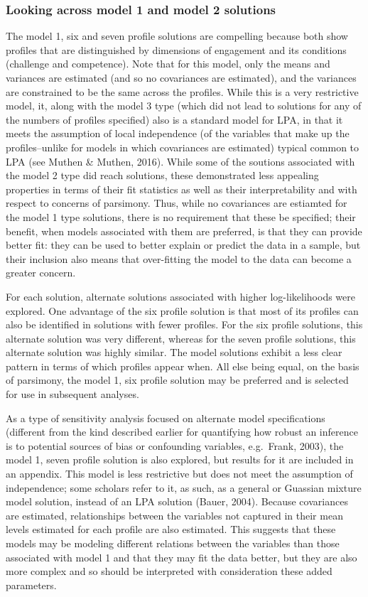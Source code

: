 \documentclass[]{msu-thesis}
\theoremstyle{definition}
\theoremstyle{definition}
\theoremstyle{definition}
\theoremstyle{remark}
\begin{document}
\subsubsection{Looking across model 1 and model 2
solutions}\label{looking-across-model-1-and-model-2-solutions}

The model 1, six and seven profile solutions are compelling because both
show profiles that are distinguished by dimensions of engagement and its
conditions (challenge and competence). Note that for this model, only
the means and variances are estimated (and so no covariances are
estimated), and the variances are constrained to be the same across the
profiles. While this is a very restrictive model, it, along with the
model 3 type (which did not lead to solutions for any of the numbers of
profiles specified) also is a standard model for LPA, in that it meets
the assumption of local independence (of the variables that make up the
profiles--unlike for models in which covariances are estimated) typical
common to LPA (see Muthen \& Muthen, 2016). While some of the soutions
associated with the model 2 type did reach solutions, these demonstrated
less appealing properties in terms of their fit statistics as well as
their interpretability and with respect to concerns of parsimony. Thus,
while no covariances are estiamted for the model 1 type solutions, there
is no requirement that these be specified; their benefit, when models
associated with them are preferred, is that they can provide better fit:
they can be used to better explain or predict the data in a sample, but
their inclusion also means that over-fitting the model to the data can
become a greater concern.

For each solution, alternate solutions associated with higher
log-likelihoods were explored. One advantage of the six profile solution
is that most of its profiles can also be identified in solutions with
fewer profiles. For the six profile solutions, this alternate solution
was very different, whereas for the seven profile solutions, this
alternate solution was highly similar. The model solutions exhibit a
less clear pattern in terms of which profiles appear when. All else
being equal, on the basis of parsimony, the model 1, six profile
solution may be preferred and is selected for use in subsequent
analyses.

As a type of sensitivity analysis focused on alternate model
specifications (different from the kind described earlier for
quantifying how robust an inference is to potential sources of bias or
confounding variables, e.g.~Frank, 2003), the model 1, seven profile
solution is also explored, but results for it are included in an
appendix. This model is less restrictive but does not meet the
assumption of independence; some scholars refer to it, as such, as a
general or Guassian mixture model solution, instead of an LPA solution
(Bauer, 2004). Because covariances are estimated, relationships between
the variables not captured in their mean levels estimated for each
profile are also estimated. This suggests that these models may be
modeling different relations between the variables than those associated
with model 1 and that they may fit the data better, but they are also
more complex and so should be interpreted with consideration these added
parameters.
\end{document}
